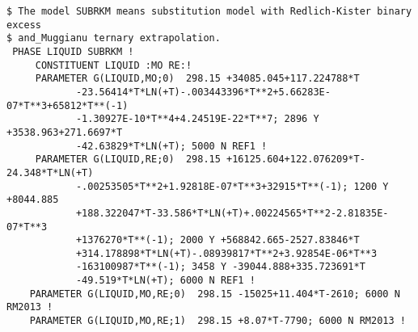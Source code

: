 \documentclass[12pt]{article}
\begin{document}
{\begin{verbatim}
$ The model SUBRKM means substitution model with Redlich-Kister binary excess
$ and_Muggianu ternary extrapolation.
 PHASE LIQUID SUBRKM !
     CONSTITUENT LIQUID :MO RE:!
     PARAMETER G(LIQUID,MO;0)  298.15 +34085.045+117.224788*T
            -23.56414*T*LN(+T)-.003443396*T**2+5.66283E-07*T**3+65812*T**(-1)
            -1.30927E-10*T**4+4.24519E-22*T**7; 2896 Y +3538.963+271.6697*T
            -42.63829*T*LN(+T); 5000 N REF1 !
     PARAMETER G(LIQUID,RE;0)  298.15 +16125.604+122.076209*T-24.348*T*LN(+T)
            -.00253505*T**2+1.92818E-07*T**3+32915*T**(-1); 1200 Y +8044.885
            +188.322047*T-33.586*T*LN(+T)+.00224565*T**2-2.81835E-07*T**3
            +1376270*T**(-1); 2000 Y +568842.665-2527.83846*T
            +314.178898*T*LN(+T)-.08939817*T**2+3.92854E-06*T**3
            -163100987*T**(-1); 3458 Y -39044.888+335.723691*T
            -49.519*T*LN(+T); 6000 N REF1 !
    PARAMETER G(LIQUID,MO,RE;0)  298.15 -15025+11.404*T-2610; 6000 N RM2013 !
    PARAMETER G(LIQUID,MO,RE;1)  298.15 +8.07*T-7790; 6000 N RM2013 !


\end{verbatim}}
\end{document}
